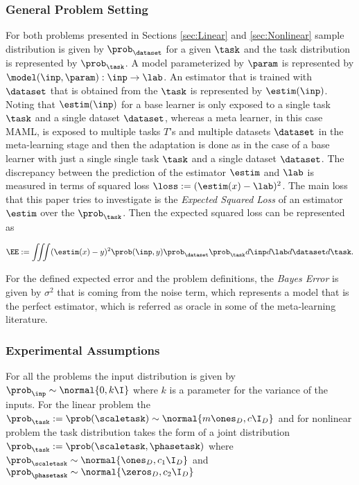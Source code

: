 \subsubsection{General Problem Setting}
For both problems presented in Sections \ref{sec:Linear} and \ref{sec:Nonlinear} sample distribution is given by $\prob_\dataset$ for a given $\task$ and the task distribution is represented by $\prob_\task$. A model parameterized by $\param$ is represented by $\model(\inp, \param):\inp\to\lab$. An estimator that is trained with $\dataset$ that is obtained from the $\task$ is represented by $\estim(\inp)$. Noting that $\estim(\inp)$ for a base learner is only exposed to a single task $\task$ and a single dataset $\dataset$, whereas  a meta learner, in this case MAML, is exposed to multiple tasks $T$'s and multiple datasets $\dataset$ in the meta-learning stage and then the adaptation is done as in the case of a base learner with just a single single task $\task$ and a single dataset $\dataset$.  The discrepancy between the prediction of the estimator $\estim$ and $\lab$ is measured in terms of squared loss $\loss:=(\estim(x)-\lab)^2$. The main loss that this paper tries to investigate is the \textit{Expected Squared Loss} of an estimator $\estim$ over the $\prob_{\task}$. Then the expected squared loss can be represented as

\begin{equation}\label{eq:ee}
  \EE:= \iiint(\estim(x) - y)^2\prob(\inp, y)\prob_{\dataset}\prob_{\task} d\inp d\lab d\dataset d\task.
\end{equation}

For the defined expected error and the problem definitions, the \textit{Bayes Error} is given by $\sigma^2$ that is coming from the noise term, which represents a model that is the perfect estimator, which is referred as oracle in some of the meta-learning literature.

\subsubsection{Experimental Assumptions}
For all the problems the input distribution is given by $\prob_\inp\sim\normal{0,k\I}$ where $k$ is a parameter for the variance of the inputs. For the linear problem the $\prob_\task:=\prob(\scaletask)\sim\normal{{m\ones_{D}},{c\I_{D}}}$ and for nonlinear problem the task distribution takes the form of a joint distribution $\prob_\task:=\prob(\scaletask, \phasetask)$ where $\prob_{\scaletask}\sim\normal{\ones_{D},c_1\I_{D}}$ and $\prob_{\phasetask}\sim\normal{\zeros_{D},c_2\I_{D}}$

